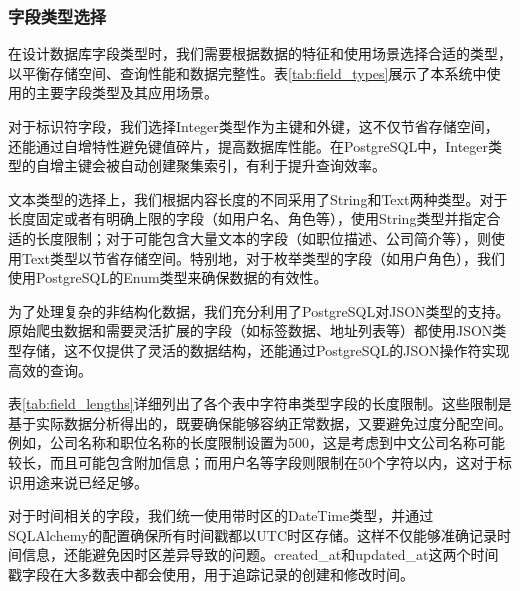   \subsubsection{字段类型选择}
  
  在设计数据库字段类型时，我们需要根据数据的特征和使用场景选择合适的类型，以平衡存储空间、查询性能和数据完整性。表\ref{tab:field_types}展示了本系统中使用的主要字段类型及其应用场景。
  
  对于标识符字段，我们选择Integer类型作为主键和外键，这不仅节省存储空间，还能通过自增特性避免键值碎片，提高数据库性能。在PostgreSQL中，Integer类型的自增主键会被自动创建聚集索引，有利于提升查询效率。
  
  文本类型的选择上，我们根据内容长度的不同采用了String和Text两种类型。对于长度固定或者有明确上限的字段（如用户名、角色等），使用String类型并指定合适的长度限制；对于可能包含大量文本的字段（如职位描述、公司简介等），则使用Text类型以节省存储空间。特别地，对于枚举类型的字段（如用户角色），我们使用PostgreSQL的Enum类型来确保数据的有效性。
  
  为了处理复杂的非结构化数据，我们充分利用了PostgreSQL对JSON类型的支持。原始爬虫数据和需要灵活扩展的字段（如标签数据、地址列表等）都使用JSON类型存储，这不仅提供了灵活的数据结构，还能通过PostgreSQL的JSON操作符实现高效的查询。
  
  表\ref{tab:field_lengths}详细列出了各个表中字符串类型字段的长度限制。这些限制是基于实际数据分析得出的，既要确保能够容纳正常数据，又要避免过度分配空间。例如，公司名称和职位名称的长度限制设置为500，这是考虑到中文公司名称可能较长，而且可能包含附加信息；而用户名等字段则限制在50个字符以内，这对于标识用途来说已经足够。
  
  对于时间相关的字段，我们统一使用带时区的DateTime类型，并通过SQLAlchemy的配置确保所有时间戳都以UTC时区存储。这样不仅能够准确记录时间信息，还能避免因时区差异导致的问题。created\_at和updated\_at这两个时间戳字段在大多数表中都会使用，用于追踪记录的创建和修改时间。
  
